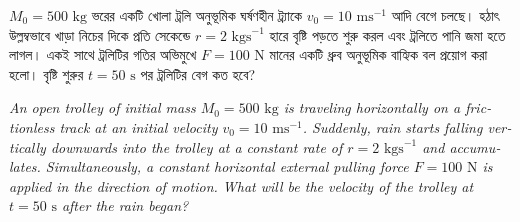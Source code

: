 \documentclass[12pt, a4paper]{article}
\begin{document}
\begin{tcolorbox}[questionbox={প্রশ্ন (Question) 37}]
    \noindent
    $M_0 = 500\text{ kg}$ ভরের একটি খোলা ট্রলি অনুভূমিক ঘর্ষণহীন ট্র্যাকে $v_0 = 10\text{ ms}^{-1}$ আদি বেগে চলছে। হঠাৎ উল্লম্বভাবে খাড়া নিচের দিকে প্রতি সেকেন্ডে $r = 2\text{ kgs}^{-1}$ হারে বৃষ্টি পড়তে শুরু করল এবং ট্রলিতে পানি জমা হতে লাগল। একই সাথে ট্রলিটির গতির অভিমুখে $F = 100\text{ N}$ মানের একটি ধ্রুব অনুভূমিক বাহ্যিক বল প্রয়োগ করা হলো। বৃষ্টি শুরুর $t = 50\text{ s}$ পর ট্রলিটির বেগ কত হবে?
    
    \vspace{0.8em}
    \begin{english}
    \noindent\textit{\color{darkgray}
    An open trolley of initial mass $M_0 = 500\text{ kg}$ is traveling horizontally on a frictionless track at an initial velocity $v_0 = 10\text{ ms}^{-1}$. Suddenly, rain starts falling vertically downwards into the trolley at a constant rate of $r = 2\text{ kgs}^{-1}$ and accumulates. Simultaneously, a constant horizontal external pulling force $F = 100\text{ N}$ is applied in the direction of motion. What will be the velocity of the trolley at $t = 50\text{ s}$ after the rain began?
    }
    \end{english}
\end{tcolorbox}
\end{document}
